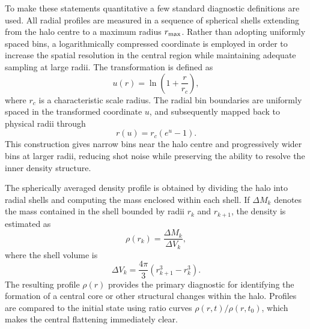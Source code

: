 To make these statements quantitative a few standard diagnostic definitions are used. All radial profiles are measured in a sequence of spherical shells extending from the halo centre to a maximum radius $r_{\rm max}$. Rather than adopting uniformly spaced bins, a logarithmically compressed coordinate is employed in order to increase the spatial resolution in the central region while maintaining adequate sampling at large radii. The transformation is defined as
\begin{equation}
u(r)=\ln\!\left(1+\frac{r}{r_c}\right),
\end{equation}
where $r_c$ is a characteristic scale radius. The radial bin boundaries are uniformly spaced in the transformed coordinate $u$, and subsequently mapped back to physical radii through
\begin{equation}
r(u)=r_c\left(e^u-1\right).
\end{equation}
This construction gives narrow bins near the halo centre and progressively wider bins at larger radii, reducing shot noise while preserving the ability to resolve the inner density structure.

The spherically averaged density profile is obtained by dividing the halo into radial shells and computing the mass enclosed within each shell. If $\Delta M_k$ denotes the mass contained in the shell bounded by radii $r_k$ and $r_{k+1}$, the density is estimated as
\begin{equation}
\rho(r_k)
=
\frac{\Delta M_k}
{\Delta V_k},
\end{equation}
where the shell volume is
\begin{equation}
\Delta V_k
=
\frac{4\pi}{3}
\left(
r_{k+1}^3-r_k^3
\right).
\end{equation}
The resulting profile $\rho(r)$ provides the primary diagnostic for identifying the formation of a central core or other structural changes within the halo. Profiles are compared to the initial state using ratio curves $\rho(r,t)/\rho(r,t_0)$, which makes the central flattening immediately clear.


